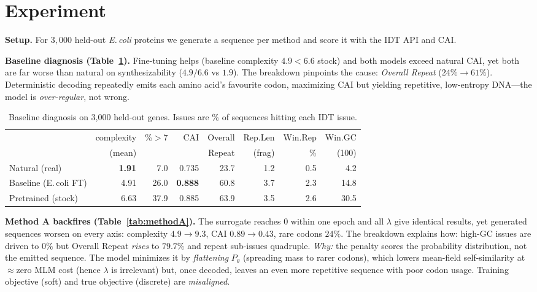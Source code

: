 \documentclass{article}
\begin{document}
\section{Experiment}

\textbf{Setup.} For $3{,}000$ held-out \emph{E.\,coli} proteins we generate a sequence per method and score it with the IDT API and CAI.

\textbf{Baseline diagnosis (Table~\ref{tab:base}).} Fine-tuning helps (baseline complexity $4.9 < 6.6$ stock) and both models exceed natural CAI, yet both are far worse than natural on synthesizability ($4.9/6.6$ vs $1.9$). The breakdown pinpoints the cause: \emph{Overall Repeat} ($24\%\!\to\!61\%$). Deterministic decoding repeatedly emits each amino acid's favourite codon, maximizing CAI but yielding repetitive, low-entropy DNA---the model is \emph{over-regular}, not wrong.

\begin{table}[t]
\centering\small
\caption{Baseline diagnosis on 3{,}000 held-out genes. Issues are \% of sequences hitting each IDT issue.}
\label{tab:base}
\begin{tabular}{lrrr@{\hskip 14pt}rrrr}
\toprule
 & complexity & \%${>}7$ & CAI & Overall & Rep.Len & Win.Rep & Win.GC \\
 & (mean) & & & Repeat & (frag) & \% & (100) \\
\midrule
Natural (real)      & \textbf{1.91} & 7.0  & 0.735 & 23.7 & 1.2 & 0.5 & 4.2 \\
Baseline (E.\,coli FT) & 4.91 & 26.0 & \textbf{0.888} & 60.8 & 3.7 & 2.3 & 14.8 \\
Pretrained (stock)  & 6.63 & 37.9 & 0.885 & 63.9 & 3.5 & 2.6 & 30.5 \\
\bottomrule
\end{tabular}
\end{table}

\textbf{Method A backfires (Table~\ref{tab:methodA}).} The surrogate reaches $0$ within one epoch and all $\lambda$ give identical results, yet generated sequences worsen on every axis: complexity $4.9\!\to\!9.3$, CAI $0.89\!\to\!0.43$, rare codons $24\%$. The breakdown explains how: high-GC issues are driven to $0\%$ but Overall Repeat \emph{rises} to $79.7\%$ and repeat sub-issues quadruple. \emph{Why:} the penalty scores the probability distribution, not the emitted sequence. The model minimizes it by \emph{flattening} $P_\theta$ (spreading mass to rarer codons), which lowers mean-field self-similarity at $\approx$zero MLM cost (hence $\lambda$ is irrelevant) but, once decoded, leaves an even more repetitive sequence with poor codon usage. Training objective (soft) and true objective (discrete) are \emph{misaligned}.
\end{document}
